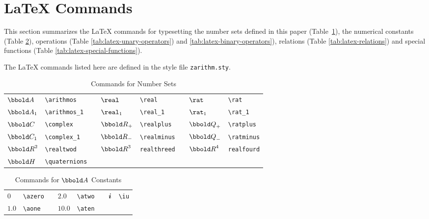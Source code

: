 \documentclass[12pt]{article}
\begin{document}
\section{\LaTeX{} Commands}
\label{sec:latex-commands}
This section summarizes the \LaTeX{} commands for typesetting the
number sets defined in this paper (Table~\ref{tab:latex-number-sets}),
the numerical constants (Table \ref{tab:latex-constants}), operations
(Table \ref{tab:latex-unary-operators}) and
\ref{tab:latex-binary-operators}), relations (Table
\ref{tab:latex-relations}) and special functions (Table
\ref{tab:latex-special-functions}).

The \LaTeX{} commands listed here are defined in the style file
\verb|zarithm.sty|.

\begin{table}[htbp]
  \centering
  \begin{tabular}{llp{1cm}llp{1cm}ll}
    $\arithmos$    & \verb|\arithmos| && $\real$ & \verb|\real|&& $\rat$ & \verb|\rat| \\
    $\arithmos_1$  & \verb|\arithmos_1| && $\real_1$ & \verb|\real_1| && $\rat_1$ & \verb|\rat_1| \\
    $\complex$ & \verb|\complex| &&  $\realplus$ & \verb|\realplus| && $\ratplus$ & \verb|\ratplus| \\ 
    $\complex_1$ & \verb|\complex_1| && $\realminus$ &
                                                       \verb|\realminus| && $\ratminus$ & \verb|\ratminus| \\
    $\realtwod$ &
                  \verb|\realtwod|
                                      &&
                                         $\realthreed$
                                                 & \verb|realthreed|
                                                               && $\realfourd$
                                                                         & \verb|realfourd|
    \\
    $\quaternions$ & \verb|\quaternions| &&  & && &    \\
  \end{tabular}
  \caption{Commands for Number Sets}
  \label{tab:latex-number-sets}
\end{table}
%
\begin{table}[htbp]
  \centering
  \begin{tabular}{llp{1cm}llp{1cm}ll}
    $0$    & \verb|\azero| && $2.0$  & \verb|\atwo| && $\bm{i}$  & \verb|\iu| \\
    $1.0$  & \verb|\aone| && $10.0$ & \verb|\aten| && & \\
  \end{tabular}
  \caption{Commands for $\arithmos$ Constants}
  \label{tab:latex-constants}
\end{table}
\end{document}
